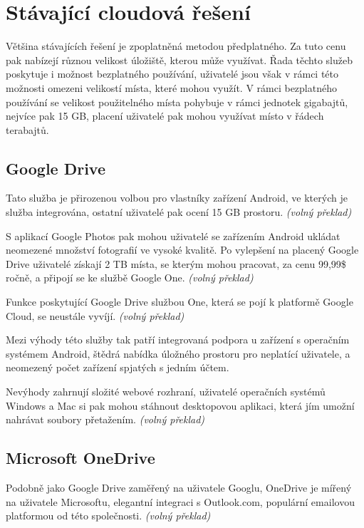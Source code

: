 \documentclass[
  glossaries,
]{kidiplom}
\begin{document}
\clearpage
\section{Stávající cloudová řešení}
Většina stávajících řešení je zpoplatněná metodou předplatného. Za tuto cenu pak nabízejí různou velikost úložiště, kterou může využívat. Řada těchto služeb poskytuje i možnost bezplatného používání, uživatelé jsou však v rámci této možnosti omezeni velikostí místa, které mohou využít. V rámci bezplatného používání se velikost použitelného místa pohybuje v rámci jednotek gigabajtů, nejvíce pak 15 GB, placení uživatelé pak mohou využívat místo v řádech terabajtů.

\subsection{Google Drive}
Tato služba je přirozenou volbou pro vlastníky zařízení Android, ve kterých je služba integrována, ostatní uživatelé pak ocení 15 GB prostoru. \cite{CLOUDSOLUTIONS} \textit {(volný překlad)}

S aplikací Google Photos pak mohou uživatelé se zařízením Android ukládat neomezené množství fotografií ve vysoké kvalitě. Po vylepšení na placený Google Drive uživatelé získají 2 TB místa, se kterým mohou pracovat, za cenu 99,99\$ ročně, a připojí se ke službě Google One. \cite{CLOUDSOLUTIONS} \textit {(volný překlad)}

Funkce poskytující Google Drive službou One, která se pojí k platformě Google Cloud, se neustále vyvíjí. \cite{CLOUDSOLUTIONS} \textit {(volný překlad)}

Mezi výhody této služby tak patří integrovaná podpora u zařízení s operačním systémem Android, štědrá nabídka úložného prostoru pro neplatící uživatele, a neomezený počet zařízení spjatých s jedním účtem.

Nevýhody zahrnují složité webové rozhraní, uživatelé operačních systémů Windows a Mac si pak mohou stáhnout desktopovou aplikaci, která jím umožní nahrávat soubory přetažením. \cite{CLOUDSOLUTIONS} \textit {(volný překlad)}

\subsection{Microsoft OneDrive}
Podobně jako Google Drive zaměřený na uživatele Googlu, OneDrive je mířený na uživatele Microsoftu, elegantní integraci s Outlook.com, populární emailovou platformou od této společnosti. \cite{CLOUDSOLUTIONS} \textit {(volný překlad)}
\end{document}

